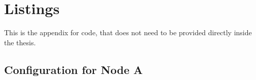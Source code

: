 
\cleardoublepage
\chapter{Listings}
\label{app:listings}

This is the appendix for code, that does not need to be provided directly inside the thesis.

\section{Configuration for Node A}

%
